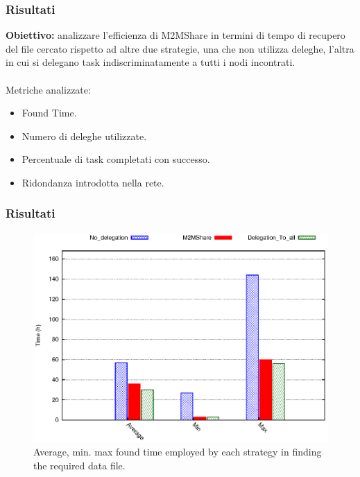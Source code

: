 \documentclass{beamer}
\begin{document}
\begin{frame}
\label{Risultati}
\frametitle{Risultati}
\textbf{Obiettivo:} analizzare l'efficienza di M2MShare in termini di tempo di recupero del file cercato rispetto ad altre due strategie, una che non utilizza deleghe, l'altra in cui si delegano task indiscriminatamente a tutti i nodi incontrati.\\
\ \\
\pause
Metriche analizzate:
\begin{itemize}
\item Found Time.
\item Numero di deleghe utilizzate.
\item Percentuale di task completati con successo.
\item Ridondanza introdotta nella rete.
\end{itemize}
\end{frame}

\begin{frame}
\frametitle{Risultati}
\begin{center}
\begin{figure}[ht]
\includegraphics[scale=0.7]{../grafici/tempi.eps}
\caption{Average, min. max found time employed by each strategy in finding the required data file.}
\end{figure}
\end{center}
\end{frame}
\end{document}
